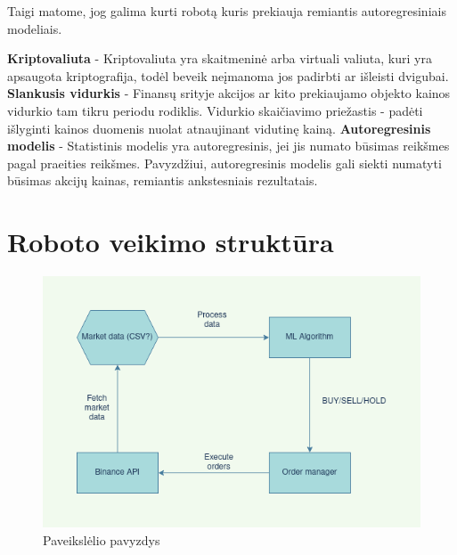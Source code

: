 \documentclass{VUMIFInfKursinis}
\begin{document}
Taigi matome, jog galima kurti robotą kuris prekiauja remiantis autoregresiniais modeliais.

\textbf{Kriptovaliuta} - Kriptovaliuta yra skaitmeninė arba virtuali valiuta, kuri yra apsaugota kriptografija, todėl beveik neįmanoma jos padirbti ar išleisti dvigubai.
\textbf{Slankusis vidurkis} - Finansų srityje akcijos ar kito prekiaujamo objekto kainos vidurkio tam tikru periodu rodiklis. Vidurkio skaičiavimo priežastis - padėti išlyginti
kainos duomenis nuolat atnaujinant vidutinę kainą.
\textbf{Autoregresinis modelis} - Statistinis modelis yra autoregresinis, jei jis numato būsimas reikšmes pagal praeities reikšmes. Pavyzdžiui, autoregresinis modelis gali
siekti numatyti būsimas akcijų kainas, remiantis ankstesniais rezultatais.

\printbibliography[heading=bibintoc] %

\appendix  %

\section{Roboto veikimo struktūra}
\begin{figure}[H]
  \centering
  \includegraphics[scale=0.5]{img/DIAGRAM}
  \caption{Paveikslėlio pavyzdys}   %
  \label{img:diagram}
\end{figure}
\end{document}
